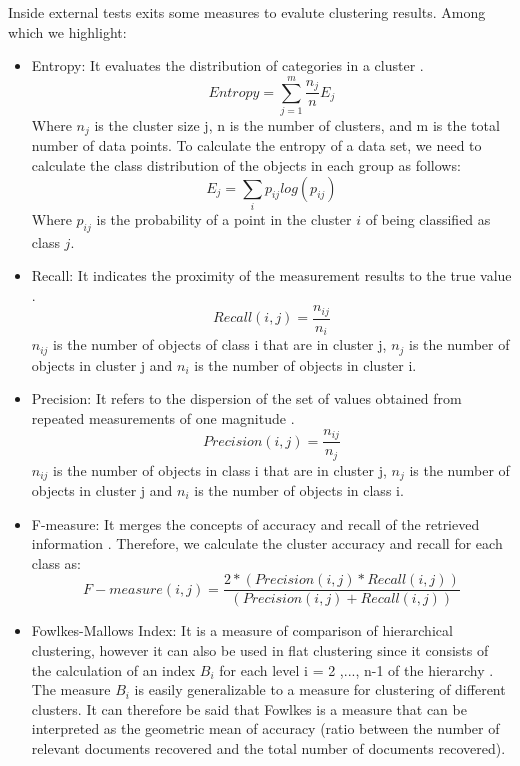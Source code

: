 Inside external tests exits some measures to evalute clustering results. Among which we highlight:

\begin{itemize}
    \item Entropy: It evaluates the distribution of categories in a cluster \citep{b40}.
    \begin{equation}
        Entropy =  \sum_{j=1}^{m} \frac{n_{j}}{n}E_{j}
    \end{equation}
    Where $n_{j}$ is the cluster size j, n is the number of clusters, and m is the total number of data points. To calculate the entropy of a data set, we need to calculate the class distribution of the objects in each group as follows:
    \begin{equation}
        E_{j} =  \sum_{i} p_{ij}log(p_{ij})
    \end{equation}
    Where $p_{ij}$ is the probability of a point in the cluster $i$ of being classified as class $j$.
    \item Recall: It indicates the proximity of the measurement results to the true value \citep{b41}.
    \begin{equation}
         Recall(i,j) = \frac{n_{ij}}{n_{i}}
    \end{equation}
    $n_{ij}$ is the number of objects of class i that are in cluster j, $n_{j}$ is the number of objects in cluster j and $n_{i}$ is the number of objects in cluster i.
    \item Precision: It refers to the dispersion of the set of values obtained from repeated measurements of one magnitude \citep{b41}.
        \begin{equation}
            Precision(i,j) = \frac{n_{ij}}{n_{j}}
        \end{equation}
     $n_{ij}$ is the number of objects in class i that are in cluster j, $n_{j}$ is the number of objects in cluster j and $n_{i}$ is the number of objects in class i.
    \item F-measure: It merges the concepts of accuracy and recall of the retrieved information \citep{b42}. Therefore, we calculate the cluster accuracy and recall for each class as:
    \begin{equation}
        F-measure(i,j) = \frac{2 * (Precision(i,j) * Recall(i,j))}{(Precision(i,j) + Recall(i,j))}
    \end{equation}
    \item Fowlkes-Mallows Index: It is a measure of comparison of hierarchical clustering, however it can also be used in flat clustering since it consists of the calculation of an index $B_{i}$ for each level i = 2 ,..., n-1 of the hierarchy \citep{b43}. The measure $B_{i}$ is easily generalizable to a measure for clustering of different clusters. It can therefore be said that Fowlkes is a measure that can be interpreted as the geometric mean of accuracy (ratio between the number of relevant documents recovered and the total number of documents recovered).

\end{itemize}
